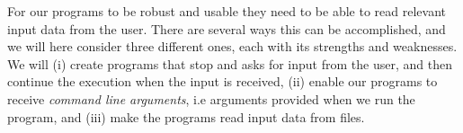 \documentclass[graybox,envcountchap,sectrefs,final]{svmonodo}
\begin{document}
For our programs to be robust and usable they need to be able to read relevant input data from the user. There
are several ways this can be accomplished, and we will here consider three different ones, each with its strengths and weaknesses.
We will (i) create programs that stop and asks for input from the user, and then continue the execution when the input is received,
(ii) enable our programs to receive \emph{command line arguments}, i.e arguments provided when we run the program, and (iii) make the
programs read input data from files.
\end{document}
